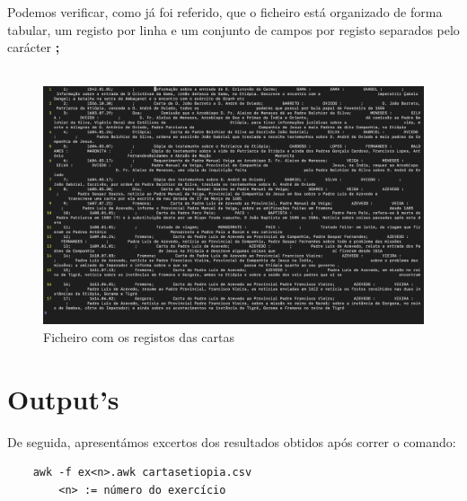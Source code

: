 \documentclass[11pt,a4paper]{report}
\begin{document}
\qquad Podemos verificar, como já foi referido, que o ficheiro está organizado de forma tabular, um registo por linha e um conjunto de campos por registo separados pelo carácter \textbf{;}
\\
\\
\begin{figure}[h]
\includegraphics[width=\textwidth]{cartas2.png}
\caption{Ficheiro com os registos das cartas}
\end{figure}

\newpage
\section{Output's}

\quad De seguida, apresentámos excertos dos resultados obtidos após correr o comando:

\begin{verbatim}
    awk -f ex<n>.awk cartasetiopia.csv
        <n> := número do exercício
\end{verbatim}
\end{document}
